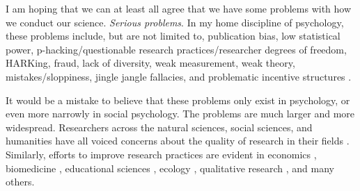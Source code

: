 \documentclass[authordate, empirical]{jote-new-article}
\author[1]{\mbox{Moin Syed\orcid{0000-0003-4759-3555}}}
\affil[1]{University of Minnesota}
\begin{document}
\begin{frontmatter}
  \maketitle
  \begin{abstract}
    \printabstracttext
  \end{abstract}
\end{frontmatter}
































\lettrine{I}{} am hoping that we can at least all agree that we have some problems with how we conduct our science. \emph{Serious problems}. In my home discipline of psychology, these problems include, but are not limited to, publication bias, low statistical power, p-hacking/questionable research practices/researcher degrees of freedom, HARKing, fraud, lack of diversity, weak measurement, weak theory, mistakes/sloppiness, jingle jangle fallacies, and problematic incentive structures \parencites{Chambers2017}{Spellman2015}{Syed2019}.







It would be a mistake to believe that these problems only exist in psychology, or even more narrowly in social psychology. The problems are much larger and more widespread. Researchers across the natural sciences, social sciences, and humanities have all voiced concerns about the quality of research in their fields \parencites{Baker2016}{Knöchelmann2019}{Munafò2017}. Similarly, efforts to improve research practices are evident in economics \parencites{Askarov2023}, biomedicine \parencites{Errington2021}, educational sciences \parencites{Fleming2021}, ecology \parencites{Fraser2018}, qualitative research \parencites{Humphreys2021}, and many others.
\end{document}
